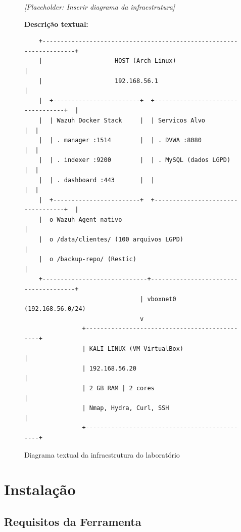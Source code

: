 \documentclass[12pt,a4paper]{article}
\begin{document}
    \begin{figure}[htbp]
    \centering
    \textit{[Placeholder: Inserir diagrama da infraestrutura]}

    \vspace{1cm}
    \noindent\textbf{Descrição textual:}
    \begin{verbatim}
    +--------------------------------------------------------------------+
    |                    HOST (Arch Linux)                               |
    |                    192.168.56.1                                    |
    |  +------------------------+  +----------------------------------+  |
    |  | Wazuh Docker Stack     |  | Servicos Alvo                    |  |
    |  | . manager :1514        |  | . DVWA :8080                     |  |
    |  | . indexer :9200        |  | . MySQL (dados LGPD)             |  |
    |  | . dashboard :443       |  |                                  |  |
    |  +------------------------+  +----------------------------------+  |
    |  o Wazuh Agent nativo                                              |
    |  o /data/clientes/ (100 arquivos LGPD)                             |
    |  o /backup-repo/ (Restic)                                          |
    +-----------------------------+--------------------------------------+
                                | vboxnet0 (192.168.56.0/24)
                                v
                +----------------------------------------------+
                | KALI LINUX (VM VirtualBox)                   |
                | 192.168.56.20                                |
                | 2 GB RAM | 2 cores                           |
                | Nmap, Hydra, Curl, SSH                       |
                +----------------------------------------------+
    \end{verbatim}
    \caption{Diagrama textual da infraestrutura do laboratório}
    \end{figure}

    \newpage
    \section{Instalação}

    \subsection{Requisitos da Ferramenta}
\end{document}
